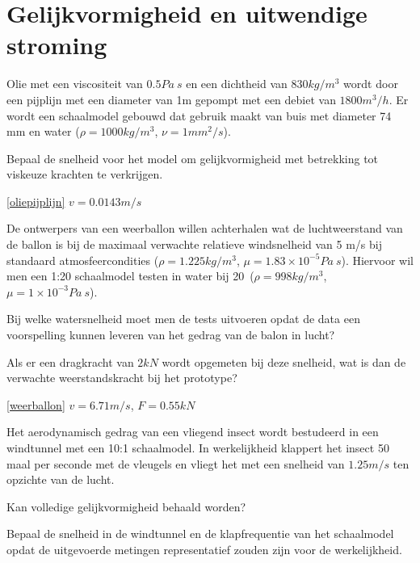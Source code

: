 \chapter{Gelijkvormigheid en uitwendige stroming}
\label{sec:Gelijkvormigheid en uitwendige stroming}
\begin{toepassing}
	\label{oliepijplijn}
Olie met een viscositeit van $0.5\unit{Pa\ s}$ en een dichtheid van $830\unit{kg/m^3}$ wordt door een pijplijn met een diameter van 1m gepompt met een debiet van $1800\unit{m^3/h}$. Er wordt een schaalmodel gebouwd dat gebruik maakt van buis met diameter 74 mm en water ($\rho = 1000\unit{kg/m^3}$, $\nu = 1\unit{mm^2/s}$).

Bepaal de snelheid voor het model om gelijkvormigheid met betrekking tot viskeuze krachten te verkrijgen.
\end{toepassing}
\begin{antwoord}{\ref{oliepijplijn}}
	$v = 0.0143\unit{m/s}$
\end{antwoord}
\begin{toepassing}[*]
	\label{weerballon}
De ontwerpers van een weerballon willen achterhalen wat de luchtweerstand van de ballon is bij de maximaal verwachte relatieve windsnelheid van 5 m/s bij standaard atmosfeercondities ($\rho = 1.225\unit{kg/m^3}$, $\mu = 1.83\times 10^{-5}\unit{Pa\ s}$).
Hiervoor wil men een 1:20 schaalmodel testen in water bij 20\degC\ ($\rho = 998\unit{kg/m^3}$, $\mu = 1\times 10^{-3}\unit{Pa\ s}$). 
		
Bij welke watersnelheid moet men de tests uitvoeren opdat de data een voorspelling kunnen leveren van het gedrag van de balon in lucht? 
		
Als er een dragkracht van $2\unit{kN}$ wordt opgemeten bij deze snelheid, wat is dan de verwachte weerstandskracht bij het prototype?
\end{toepassing}
\begin{antwoord}{\ref{weerballon}}
	$v = 6.71\unit{m/s}$, $F = 0.55\unit{kN}$
\end{antwoord}
\begin{toepassing}[*]
	\label{insect}
Het aerodynamisch gedrag van een vliegend insect wordt bestudeerd in een windtunnel met een 10:1 schaalmodel. In werkelijkheid klappert het insect 50 maal per seconde met de vleugels en vliegt het met een snelheid van $1.25\unit{m/s}$ ten opzichte van de lucht. 
		
Kan volledige gelijkvormigheid behaald worden?
		
Bepaal de snelheid in de windtunnel en de klapfrequentie van het schaalmodel opdat de uitgevoerde metingen representatief zouden zijn voor de werkelijkheid.
\end{toepassing}
